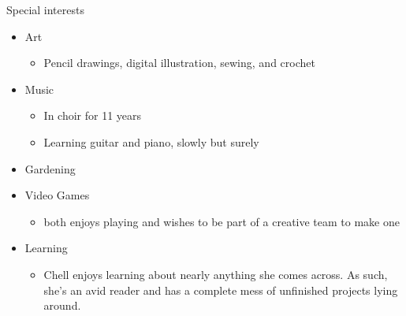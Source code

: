 \documentclass{beamer}
\begin{document}
\begin{frame}{Special interests}
\begin{itemize}
  \item Art
    \begin{itemize}
      \item Pencil drawings, digital illustration, sewing, and crochet
      \end{itemize}
  \item Music
    \begin{itemize}
      \item In choir for 11 years
      \item Learning guitar and piano, slowly but surely
      \end{itemize}
  \item Gardening
  \item Video Games
    \begin{itemize}
      \item both enjoys playing and wishes to be part of a creative team to make one
      \end{itemize}
  \item Learning
    \begin{itemize}
      \item Chell enjoys learning about nearly anything she comes across. As such, she's an avid reader and has a complete mess of unfinished projects lying around.
      \end{itemize}
  \end{itemize}
\end{frame}
\end{document}
